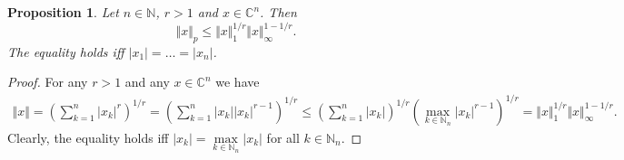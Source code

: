 \documentclass[12pt]{article}
\newtheorem{proposition}[theorem]{Proposition}
\begin{document}
\begin{proposition}\label{SpclLyapIneq}
    Let $n\in\mathbb{N}$, $r>1$ and $x\in\mathbb{C}^n$. Then
    \[
        \Vert x\Vert_p\leq \Vert x\Vert_1^{1/r}\Vert x\Vert_{\infty}^{1-1/r}.
    \]
    The equality holds iff $|x_1|=\ldots=|x_n|$.
\end{proposition}
\begin{proof}
    For any $r>1$ and any $x\in\mathbb{C}^n$ we have
    \[
    \begin{aligned}
        \Vert x\Vert
        =\left(\sum_{k=1}^n |x_k|^r \right)^{1/r}
        =\left(\sum_{k=1}^n |x_k| |x_k|^{r-1} \right)^{1/r}
        \leq\left(\sum_{k=1}^n |x_k| \right)^{1/r} 
        \left(\max\limits_{k\in\mathbb{N}_n}|x_k|^{r-1}\right)^{1/r}
        =\Vert x\Vert_1^{1/r}\Vert x\Vert_{\infty}^{1-1/r}.
    \end{aligned}
    \]
    Clearly, the equality holds iff $|x_k|=\max\limits_{k\in\mathbb{N}_n}|x_k|$
    for all $k\in\mathbb{N}_n$.
\end{proof}
\end{document}
